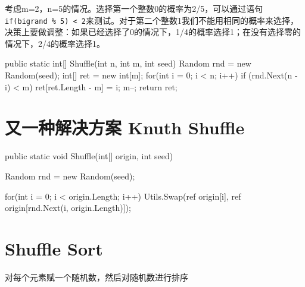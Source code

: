 考虑m=2，n=5的情况。选择第一个整数0的概率为2/5，可以通过语句\lstinline!if(bigrand % 5) < 2!来测试。对于第二个整数1我们不能用相同的概率来选择，决策上要做调整：如果已经选择了0的情况下，1/4的概率选择1；在没有选择零的情况下，2/4的概率选择1。

\begin{CSharp}
        public static int[] Shuffle(int n, int m, int seed)
        {
            Random rnd = new Random(seed);
            int[] ret = new int[m];
            for(int i = 0; i < n; i++)
            {
                if (rnd.Next(n - i) < m)
                {
                    ret[ret.Length - m] = i;
                    m--;
                }
            }
            return ret;
        }
\end{CSharp}        


\section{又一种解决方案 Knuth Shuffle}

\begin{CSharp}
        public static void Shuffle(int[] origin, int seed)
        {
            Random rnd = new Random(seed);

            for(int i = 0; i < origin.Length; i++)
            {
                Utils.Swap(ref origin[i], ref origin[rnd.Next(i, origin.Length)]);
            }
        }
\end{CSharp}

\section{Shuffle Sort}
对每个元素赋一个随机数，然后对随机数进行排序
